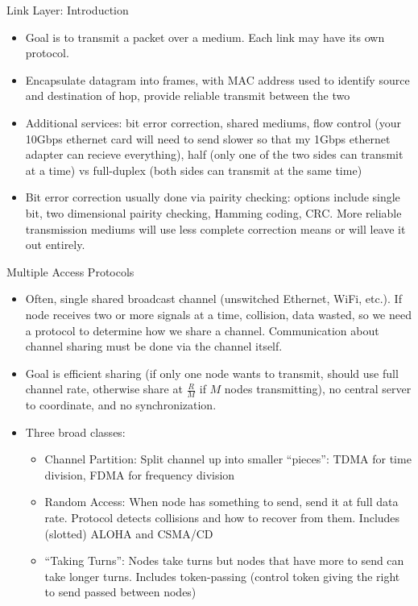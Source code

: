 \documentclass{beamer}
\begin{document}
\begin{frame}[t]{Link Layer: Introduction}
    \begin{itemize}
        \item Goal is to transmit a packet over a medium. Each link may have its own protocol.
        \pause\item Encapsulate datagram into \alert{frames}, with \alert{MAC address} used to identify source and destination of hop, provide reliable transmit between the two
        \pause\item Additional services: bit error correction, shared mediums, flow control (your 10Gbps ethernet card will need to send slower so that my 1Gbps ethernet adapter can recieve everything), half (only one of the two sides can transmit at a time) vs full-duplex (both sides can transmit at the same time)
        \pause\item Bit error correction usually done via \alert{pairity checking}: options include single bit, two dimensional pairity checking, Hamming coding, CRC. More reliable transmission mediums will use less complete correction means or will leave it out entirely.
    \end{itemize}
\end{frame}

\begin{frame}[t]{Multiple Access Protocols}
    \begin{itemize}
        \item Often, single shared broadcast channel (unswitched Ethernet, WiFi, etc.). If node receives two or more signals at a time, collision, data wasted, so we need a protocol to determine how we share a channel. Communication about channel sharing must be done via the channel itself. 
        \pause\item Goal is efficient sharing (if only one node wants to transmit, should use full channel rate, otherwise share at $\frac{R}{M}$ if $M$ nodes transmitting), no central server to coordinate, and no synchronization.
        \pause\item Three broad classes:
        \begin{itemize}
            \item \alert{Channel Partition}: Split channel up into smaller ``pieces'': TDMA for time division, FDMA for frequency division
            \pause\item \alert{Random Access}: When node has something to send, send it at full data rate. Protocol detects collisions and how to recover from them. Includes (slotted) ALOHA and CSMA/CD
            \pause\item ``Taking Turns'': Nodes take turns but nodes that have more to send can take longer turns. Includes token-passing (control token giving the right to send passed between nodes)
        \end{itemize}
    \end{itemize}
\end{frame}
\end{document}
